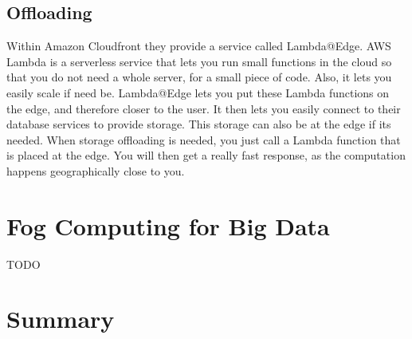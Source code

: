 \subsection{Offloading}
Within Amazon Cloudfront they provide a service called Lambda@Edge. AWS Lambda is a serverless service that lets you run small functions in the cloud so that you do not need a whole server, for a small piece of code. Also, it lets you easily scale if need be. Lambda@Edge lets you put these Lambda functions on the edge, and therefore closer to the user. It then lets you easily connect to their database services to provide storage. This storage can also be at the edge if its needed. When storage offloading is needed, you just call a Lambda function that is placed at the edge. You will then get a really fast response, as the computation happens geographically close to you.


\section{Fog Computing for Big Data}
TODO


\section{Summary}